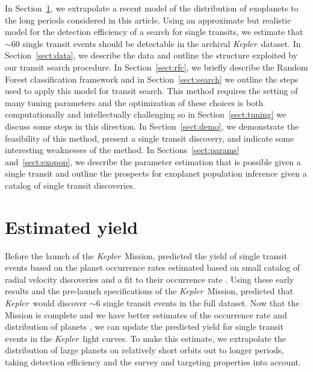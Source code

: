 \documentclass[12pt,preprint]{aastex}
\newcommand{\project}[1]{\textsl{#1}}
\newcommand{\kepler}{\project{Kepler}}
\newcommand{\paper}{article}
\newcommand{\sectionname}{Section}
\newcommand{\sectref}[1]{\ref{sect:#1}}
\newcommand{\Sect}[1]{\sectionname~\sectref{#1}}
\newcommand{\sect}[1]{\Sect{#1}}
\newcommand{\sectlabel}[1]{\label{sect:#1}}
\begin{document}
In \sect{est}, we extrapolate a recent model of the distribution of exoplanets
to the long periods considered in this \paper.
Using an approximate but realistic model for the detection efficiency of a
search for single transits, we estimate that $\sim 60$ single transit events
should be detectable in the archival \kepler\ dataset.
In \sect{data}, we describe the data and outline the structure exploited by
our transit search procedure.
In \sect{rfc}, we briefly describe the Random Forest classification framework
and in \sect{search} we outline the steps used to apply this model for transit
search.
This method requires the setting of many tuning parameters and the
optimization of these choices is both computationally and intellectually
challenging so in \sect{tuning} we discuss some steps in this direction.
In \sect{demo}, we demonstrate the feasibility of this method, present a
single transit discovery, and indicate some interesting weaknesses of the
method.
In \sectionname s~\sectref{params} and~\sectref{exopop}, we describe the
parameter estimation that is possible given a single transit and outline the
prospects for exoplanet population inference given a catalog of single transit
discoveries.


\section{Estimated yield}\sectlabel{est}

Before the launch of the \kepler\ Mission, \citet{Yee:2008} predicted the
yield of single transit events based on the planet occurrence rates estimated
based on small catalog of radial velocity discoveries \citep{Butler:2006} and
a fit to their occurrence rate \citep{Cumming:2008}.
Using these early results and the pre-launch specifications of the \kepler\
Mission, \citet{Yee:2008} predicted that \kepler\ would discover $\sim 6$
single transit events in the full dataset.
Now that the Mission is complete and we have better estimates of the
occurrence rate and distribution of planets \citep[for example][]{Dong:2013,
Petigura:2013, Foreman-Mackey:2014, Dressing:2015}, we can update the
predicted yield for single transit events in the \kepler\ light curves.
To make this estimate, we extrapolate the distribution of large planets on
relatively short orbits out to longer periods, taking detection efficiency
and the survey and targeting properties into account.
\end{document}
